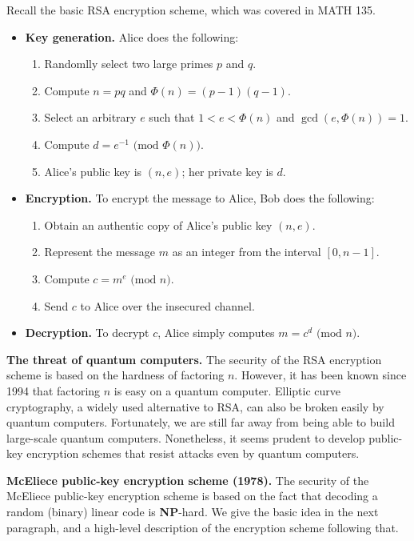 \documentclass[10pt]{article}
\theoremstyle{newstyle}
\begin{document}
Recall the basic RSA encryption scheme, which was covered in MATH 135. 
\begin{itemize}
    \item {\bf Key generation.} Alice does the following: 
    \begin{enumerate}
        \item Randomlly select two large primes $p$ and $q$. 
        \item Compute $n = pq$ and $\Phi(n) = (p-1)(q-1)$. 
        \item Select an arbitrary $e$ such that $1 < e < \Phi(n)$ and $\gcd(e, \Phi(n)) = 1$. 
        \item Compute $d = e^{-1} \text{ (mod $\Phi(n)$)}$. 
        \item Alice's public key is $(n, e)$; her private key is $d$. 
    \end{enumerate}
    \item {\bf Encryption.} To encrypt the message to Alice, Bob does the following:
    \begin{enumerate}
        \item Obtain an authentic copy of Alice's public key $(n, e)$. 
        \item Represent the message $m$ as an integer from the interval $[0, n-1]$. 
        \item Compute $c = m^e \text{ (mod $n$)}$. 
        \item Send $c$ to Alice over the insecured channel. 
    \end{enumerate}
    \item {\bf Decryption.} To decrypt $c$, Alice simply computes $m = c^d \text{ (mod $n$)}$. 
\end{itemize}

{\bf The threat of quantum computers.} 
The security of the RSA encryption scheme is based on the hardness of factoring $n$. However, 
it has been known since 1994 that factoring $n$ is easy on a quantum computer. Elliptic 
curve cryptography, a widely used alternative to RSA, can also be broken easily by quantum computers. 
Fortunately, we are still far away from being able to build large-scale quantum computers. 
Nonetheless, it seems prudent to develop public-key encryption schemes that resist attacks even 
by quantum computers. 

{\bf McEliece public-key encryption scheme (1978).} The security of the McEliece public-key
encryption scheme is based on the fact that decoding a random (binary) linear code is 
{\bf NP}-hard. We give the basic idea in the next paragraph, and a high-level description of the 
encryption scheme following that. 
\end{document}
